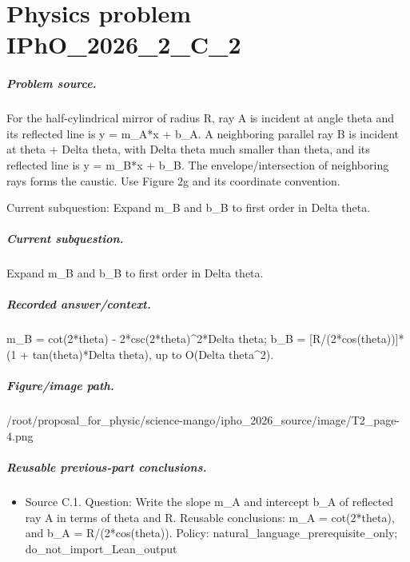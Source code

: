 
\chapter{Physics problem IPhO\_2026\_2\_C\_2}
\label{ch:IPhO2026Problems_problem_IPhO_2026_2_C_2}

\paragraph{Problem source.}
For the half-cylindrical mirror of radius R, ray A is incident at angle theta
and its reflected line is y = m\_A*x + b\_A.  A neighboring parallel ray B is
incident at theta + Delta theta, with Delta theta much smaller than theta, and
its reflected line is y = m\_B*x + b\_B.  The envelope/intersection of neighboring
rays forms the caustic.  Use Figure 2g and its coordinate convention.

Current subquestion:
Expand m\_B and b\_B to first order in Delta theta.

\paragraph{Current subquestion.}
Expand m\_B and b\_B to first order in Delta theta.

\paragraph{Recorded answer/context.}
m\_B = cot(2*theta) - 2*csc(2*theta)\textasciicircum{}2*Delta theta; b\_B = [R/(2*cos(theta))]*(1 + tan(theta)*Delta theta), up to O(Delta theta\textasciicircum{}2).

\paragraph{Figure/image path.}
/root/proposal\_for\_physic/science-mango/ipho\_2026\_source/image/T2\_page-4.png

\paragraph{Reusable previous-part conclusions.}
\begin{itemize}
\item Source C.1. Question: Write the slope m\_A and intercept b\_A of reflected ray A in terms of theta and R. Reusable conclusions: m\_A = cot(2*theta), and b\_A = R/(2*cos(theta)). Policy: natural\_language\_prerequisite\_only; do\_not\_import\_Lean\_output
\end{itemize}

